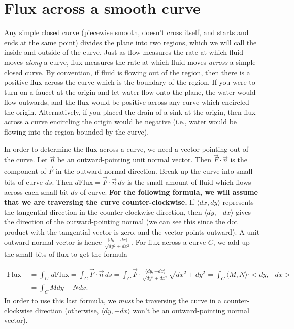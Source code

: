 \section{Flux across a smooth curve} 

Any simple closed curve (piecewise smooth, doesn't cross itself, and
starts and ends at the same point) divides the plane into two regions,
which we will call the inside and outside of the curve. Just as flow
measures the rate at which fluid moves \emph{along} a curve, flux
measures the rate at which fluid moves \emph{across} a simple closed
curve.  By convention, if fluid is flowing out of the region, then there
is a positive flux across the curve which is the boundary of the
region. If you were to turn on a faucet at the origin and let water
flow onto the plane, the water would flow outwards, and the flux would
be positive across any curve which encircled the origin.
Alternatively, if you placed the drain of a sink at the origin, then
flux across a curve encircling the origin would be negative (i.e.,
water would be flowing into the region bounded by the curve).

In order to determine the flux across a curve, we need a vector
pointing out of the curve.  Let $\vec n$ be an outward-pointing unit
normal vector.  Then $\vec F\cdot \vec n$ is the component of $\vec F$ in
the outward normal direction. Break up the curve into small bits of
curve $ds$.  Then $d\text{Flux} = \vec F\cdot \vec n \,ds$ is the small
amount of fluid which flows across each small bit $ds$ of
curve. \textbf{For the following formula, we will assume that we are
  traversing the curve counter-clockwise.}  If {$\langle dx,dy\rangle$} represents
the tangential direction in the counter-clockwise direction, then {$\langle
  dy,-dx\rangle$} gives the direction of the outward-pointing normal (we can
see this since the dot product with the tangential vector is zero, and
the vector points outward). A unit outward normal vector is hence $
\frac{\langle dy,-dx\rangle}{\sqrt{dy^2+dx^2}}$. For flux across a curve $C$, we
add up the small bits of flux to get the formula 

\begin{align*}
  \text{Flux } &= \int_C\,d\text{Flux} = \int_C\vec F\cdot \vec n \,ds = \int_C\vec
  F\cdot \frac{\langle dy,-dx\rangle}{\sqrt{dy^2+dx^2}} \sqrt{dx^2+dy^2} 
  = \int_C \langle M,N\rangle
  \cdot <dy,-dx> \\&= \int_C Mdy-Ndx.
\end{align*}
  In order to use this last formula, we
\emph{must} be traversing the curve in a counter-clockwise direction
(otherwise, $\langle dy,-dx\rangle$ won't be an outward-pointing normal vector).

